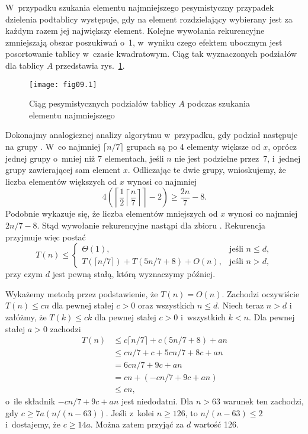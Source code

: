 \exercise %
W~przypadku szukania elementu najmniejszego pesymistyczny przypadek dzielenia podtablicy występuje, gdy na element rozdzielający wybierany jest za każdym razem jej największy element. Kolejne wywołania rekurencyjne zmniejszają obszar poszukiwań o~1, w~wyniku czego efektem ubocznym jest posortowanie tablicy w~czasie kwadratowym. Ciąg tak wyznaczonych podziałów dla tablicy $A$ przedstawia rys.~\ref{fig:9.2-4}.

\begin{figure}[ht]
	\begin{center}
		\texttt{[image: fig09.1]}
	\end{center}
	\caption{Ciąg pesymistycznych podziałów tablicy $A$ podczas szukania elementu najmniejszego} \label{fig:9.2-4}
\end{figure}


\exercise %
Dokonajmy analogicznej analizy algorytmu  w~przypadku, gdy podział następuje na grupy . W~co najmniej $\lceil n/7\rceil$ grupach są po 4 elementy większe od $x$, oprócz jednej grupy o~mniej niż 7 elementach, jeśli $n$ nie jest podzielne przez~7, i~jednej grupy zawierającej sam element $x$. Odliczając te dwie grupy, wnioskujemy, że liczba elementów większych od $x$ wynosi co najmniej
\[
	4\left(\left\lceil\frac{1}{2}\left\lceil\frac{n}{7}\right\rceil\right\rceil-2\right) \ge \frac{2n}{7}-8.
\]
Podobnie wykazuje się, że liczba elementów mniejszych od $x$ wynosi co najmniej $2n/7-8$. Stąd wywołanie rekurencyjne nastąpi dla zbioru . Rekurencja przyjmuje więc postać
\[
	T(n) \le \begin{cases}
		\Theta(1), & \text{jeśli $n\le d$}, \\
		T(\lceil n/7\rceil)+T(5n/7+8)+O(n), & \text{jeśli $n>d$},
	\end{cases}
\]
przy czym $d$ jest pewną stałą, którą wyznaczymy później.

Wykażemy metodą przez podstawienie, że $T(n)=O(n)$. Zachodzi oczywiście $T(n)\le cn$ dla pewnej stałej $c>0$ oraz wszystkich $n\le d$. Niech teraz $n>d$ i załóżmy, że $T(k)\le ck$ dla pewnej stałej $c>0$ i~wszystkich $k<n$. Dla pewnej stałej $a>0$ zachodzi
\begin{align*}
	T(n) &\le c\lceil n/7\rceil+c(5n/7+8)+an \\
	&\le cn/7+c+5cn/7+8c+an \\
	&= 6cn/7+9c+an \\
	&= cn+(-cn/7+9c+an) \\
	&\le cn,
\end{align*}
o~ile składnik $-cn/7+9c+an$ jest niedodatni. Dla $n>63$ warunek ten zachodzi, gdy $c\ge7a(n/(n-63))$. Jeśli z~kolei $n\ge126$, to $n/(n-63)\le2$ i~dostajemy, że $c\ge14a$. Można zatem przyjąć za $d$ wartość 126.

